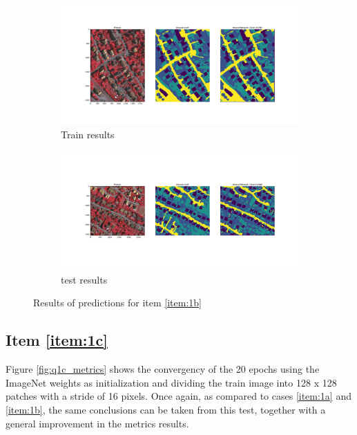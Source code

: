 \documentclass[10pt, a4paper]{article}
\begin{document}
\begin{figure}[htpb]
  \centering
  \begin{subfigure}[b]{0.45\textwidth}
      \centering
      \includegraphics[width=\textwidth]{images/Patch64_imagenet_train.pdf}
      \caption{Train results}
      \label{fig:q1b_train}
  \end{subfigure}
  \hspace{0.05\textwidth}
  \begin{subfigure}[b]{0.45\textwidth}
    \centering
    \includegraphics[width=\textwidth]{images/Patch64_imagenet_test.pdf}
    \caption{test results}
    \label{fig:q1b_test}
  \end{subfigure}
  \caption{Results of predictions for item \ref{item:1b}}
  \label{fig:q1b_results}
\end{figure}

\subsection{Item \ref{item:1c}}

Figure \ref{fig:q1c_metrics} shows the convergency of the 20 epochs using the ImageNet weights as initialization and dividing the train image into 128 x 128 patches 
with a stride of 16 pixels. Once again, as compared to cases \ref{item:1a} and \ref{item:1b}, the same conclusions can be taken from this test, together with a general improvement in the metrics 
results.
\end{document}

